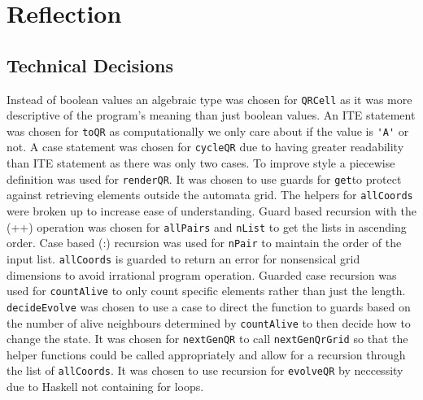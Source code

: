 \documentclass[11pt]{article}
\begin{document}
\section{Reflection}
\subsection{Technical Decisions}
 Instead of boolean values an algebraic type was chosen for  \verb|QRCell| as it was more descriptive of the program's meaning than just boolean values. An ITE statement was chosen for \verb|toQR| as computationally we only care about if the value is \verb|'A'| or not. A case statement was chosen for \verb|cycleQR| due to having greater readability than ITE statement as there was only two cases. To improve style a piecewise definition was used for \verb|renderQR|. It was chosen to use guards for \verb|get|to protect against retrieving elements outside the automata grid.  The helpers for \verb|allCoords| were broken up to increase ease of understanding. Guard based recursion with the (++) operation was chosen for \verb|allPairs| and \verb|nList| to get the lists in ascending order. Case based (:) recursion was used for \verb|nPair| to maintain the order of the input list. \verb|allCoords| is guarded to return an error for nonsensical grid dimensions to avoid irrational program operation. Guarded case recursion was used for \verb|countAlive| to only count specific elements rather than just the length. \verb|decideEvolve| was chosen to use a case to direct the function to guards based on the number of alive neighbours determined by \verb|countAlive| to then decide how to change  the state. It was chosen for \verb|nextGenQR| to call \verb|nextGenQrGrid| so that the helper functions could be called appropriately and allow for a recursion through the list of \verb|allCoords|. It was chosen to use recursion for \verb|evolveQR| by neccessity due to Haskell not containing for loops.
\end{document}
